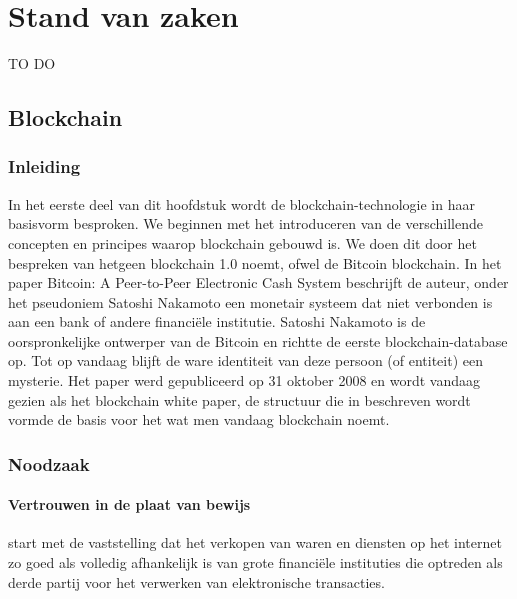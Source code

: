 \chapter{Stand van zaken}
\label{ch:stand-van-zaken}



TO DO

\newpage
\section{Blockchain}
	\subsection*{Inleiding}
	In het eerste deel van dit hoofdstuk wordt de blockchain-technologie in haar basisvorm besproken. We beginnen met het introduceren  van  de verschillende concepten en principes waarop blockchain gebouwd is.  We doen dit door het bespreken van hetgeen \textcite{Swan2015} blockchain 1.0 noemt, ofwel de Bitcoin blockchain. In het paper Bitcoin: A Peer-to-Peer Electronic Cash System beschrijft de auteur, onder het pseudoniem Satoshi Nakamoto een monetair systeem dat niet verbonden is aan een bank of  andere financiële institutie. Satoshi Nakamoto is de oorspronkelijke ontwerper van de Bitcoin en richtte de eerste blockchain-database op. Tot op vandaag blijft de ware identiteit van deze persoon (of entiteit) een mysterie. Het paper werd gepubliceerd op 31 oktober 2008 en wordt vandaag gezien als het blockchain white paper,  de structuur die in \textcite{Nakamoto2008} beschreven wordt vormde de basis voor het wat men vandaag blockchain noemt.
	\subsection{Noodzaak}
			\subsubsection{Vertrouwen in de plaat van bewijs}
			\textcite{Nakamoto2008} start met de vaststelling dat het verkopen van waren en diensten op het internet zo goed als volledig afhankelijk is van grote financiële instituties die optreden als derde partij voor het verwerken van elektronische transacties. 
		
